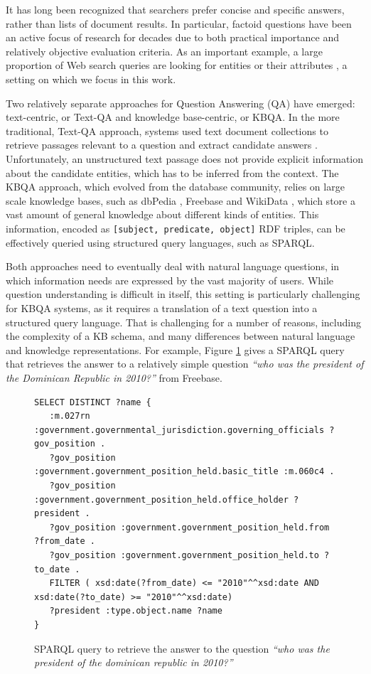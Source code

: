 It has long been recognized that searchers prefer concise and specific answers, rather than lists of document results.
In particular, factoid questions have been an active focus of research for decades due to both practical importance and relatively objective evaluation criteria.
As an important example, a large proportion of Web search queries are looking for entities or their attributes \cite{Pound:2010:AOR:1772690.1772769}, a setting on which we focus in this work. 

Two relatively separate approaches for Question Answering (QA) have emerged: text-centric, or Text-QA and knowledge base-centric, or KBQA.
In the more traditional, Text-QA approach, systems used text document collections to retrieve passages relevant to a question and extract candidate answers \cite{dang2007overview}.
Unfortunately, an unstructured text passage does not provide explicit information about the candidate entities, which has to be inferred from the context.
The KBQA approach, which evolved from the database community, relies on large scale knowledge bases, such as dbPedia \cite{auer2007dbpedia}, Freebase \cite{Bollacker:2008:FCC:1376616.1376746} and WikiData \cite{Vrandecic:2014:WFC:2661061.2629489}, which store a vast amount of general knowledge about different kinds of entities.
This information, encoded as \texttt{[subject, predicate, object]} RDF triples, can be effectively queried using structured query languages, such as SPARQL.

Both approaches need to eventually deal with natural language questions, in which information needs are expressed by the vast majority of users.
While question understanding is difficult in itself, this setting is particularly challenging for KBQA systems, as it requires a translation of a text question into a structured query language.
That is challenging for a number of reasons, including the complexity of a KB schema, and many differences between natural language and knowledge representations. 
For example, Figure \ref{fig:example_sparql} gives a SPARQL query that retrieves the answer to a relatively simple question \textit{``who was the president of the Dominican Republic in 2010?''} from Freebase.

\begin{figure}
\centering
\begin{lstlisting}[frame=single,basicstyle=\small]
SELECT DISTINCT ?name {
   :m.027rn :government.governmental_jurisdiction.governing_officials ?gov_position .
   ?gov_position :government.government_position_held.basic_title :m.060c4 .
   ?gov_position :government.government_position_held.office_holder ?president .
   ?gov_position :government.government_position_held.from ?from_date .
   ?gov_position :government.government_position_held.to ?to_date .
   FILTER ( xsd:date(?from_date) <= "2010"^^xsd:date AND xsd:date(?to_date) >= "2010"^^xsd:date)
   ?president :type.object.name ?name
}
\end{lstlisting}
\vspace{-4mm}
\caption{SPARQL query to retrieve the answer to the question \textit{``who was the president of the dominican republic in 2010?''}}
\label{fig:example_sparql}
\end{figure}

